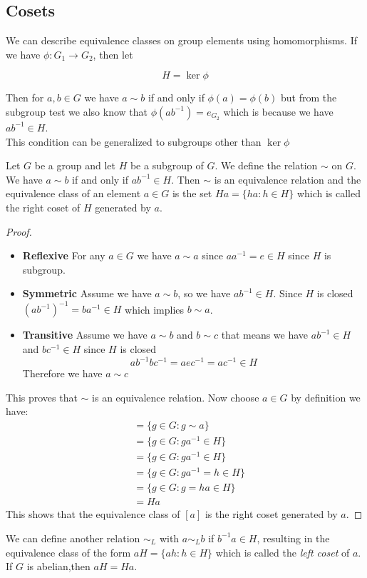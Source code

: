 \documentclass[16pt,a4paper]{article}
\theoremstyle{definition}
\begin{document}
\subsection{Cosets}
We can describe equivalence classes on group elements using homomorphisms. If we have $\phi: G_1 \rightarrow G_2$, then let

\[H=\ker\phi\] 

Then for $a,b\in G$ we have $a\sim b$ if and only if $\phi(a) = \phi(b)$ but from the subgroup test we also know that $\phi(ab^{-1}) = e_{G_2}$ which is because we have $ab^{-1}\in H$. 
\\
This condition can be generalized to subgroups other than $\ker \phi$

\begin{thm}{}{}
Let $G$ be a group and let $H$ be a subgroup of $G$. We define the relation $\sim$ on $G$. We have $a\sim b$ if and only if $ab^{-1}\in H$. Then $\sim$ is an equivalence relation and the equivalence class of an element $a\in G$ is the set $Ha =\{ha : h\in H\}$ which is called the right coset of $H$ generated by $a$. 	
\end{thm}

\begin{proof}
$\quad$\\
\begin{itemize}
\item \textbf{Reflexive} For any $a\in G$ we have $a\sim a$ since $aa^{-1}=e\in H$ since $H$ is subgroup. 
\item \textbf{Symmetric} Assume we have $a\sim b$, so we have $ab^{-1}\in H$. Since $H$ is closed $(ab^{-1})^{-1} = ba^{-1}\in H$ which implies $b\sim a$. 

\item \textbf{Transitive} Assume we have $a\sim b$ and $b\sim c$ that means we have $ab^{-1}\in H$ and $bc^{-1}\in H$ since $H$ is closed 
\[ab^{-1}bc^{-1} = aec^{-1} = ac^{-1}\in H\]
Therefore we have $a\sim c$
\end{itemize}
This proves that $\sim$ is an equivalence relation. 
Now choose $a\in G$ by definition we have: 
\begin{align*}
[a] &= \{g\in G : g\sim a\}\\
&=\{g\in G : ga^{-1}\in H\} \\
&=\{g\in G : ga^{-1}\in H\} \\
&= \{g\in G : ga^{-1}=h \in H\}\\
&= \{g\in G : g=ha \in H\}\\
&= Ha
\end{align*}
This shows that the equivalence class of $[a]$ is the right coset generated by $a$. 
\end{proof}
We can define another relation $\sim_L$ with $a\sim_L b$ if $b^{-1}a\in H$, resulting in the equivalence class of the form $aH = \{ah : h\in H\}$ which is called the \textit{left coset} of $a$. If $G$ is abelian,then $aH=Ha$.   
\end{document}
